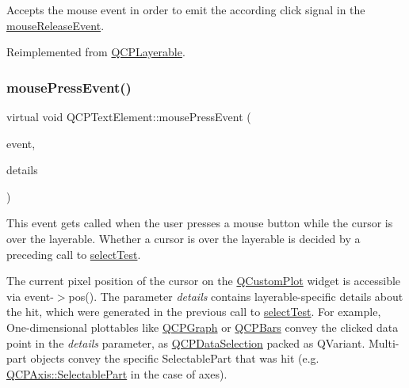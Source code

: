 Accepts the mouse event in order to emit the according click signal in the \hyperlink{class_q_c_p_text_element_acfcbaf9b1da18745e72726aafb39c855}{mouse\+Release\+Event}.

Reimplemented from \hyperlink{class_q_c_p_layerable_af6567604818db90f4fd52822f8bc8376}{Q\+C\+P\+Layerable}.

\mbox{\label{class_q_c_p_text_element_aa52d0292e7444526cccd453945238f4b}} 
\subsubsection{\texorpdfstring{mouse\+Press\+Event()}{mousePressEvent()}\hspace{0.1cm}{\footnotesize\ttfamily [2/2]}}
{\footnotesize\ttfamily virtual void Q\+C\+P\+Text\+Element\+::mouse\+Press\+Event (\begin{DoxyParamCaption}\item[{Q\+Mouse\+Event $\ast$}]{event,  }\item[{const Q\+Variant \&}]{details }\end{DoxyParamCaption})\hspace{0.3cm}{\ttfamily [virtual]}}

This event gets called when the user presses a mouse button while the cursor is over the layerable. Whether a cursor is over the layerable is decided by a preceding call to \hyperlink{class_q_c_p_text_element_a1e721bc2994a127ef5a8f0a514a5dbac}{select\+Test}.

The current pixel position of the cursor on the \hyperlink{class_q_custom_plot}{Q\+Custom\+Plot} widget is accessible via {\ttfamily event-\/$>$pos()}. The parameter {\itshape details} contains layerable-\/specific details about the hit, which were generated in the previous call to \hyperlink{class_q_c_p_text_element_a1e721bc2994a127ef5a8f0a514a5dbac}{select\+Test}. For example, One-\/dimensional plottables like \hyperlink{class_q_c_p_graph}{Q\+C\+P\+Graph} or \hyperlink{class_q_c_p_bars}{Q\+C\+P\+Bars} convey the clicked data point in the {\itshape details} parameter, as \hyperlink{class_q_c_p_data_selection}{Q\+C\+P\+Data\+Selection} packed as Q\+Variant. Multi-\/part objects convey the specific {\ttfamily Selectable\+Part} that was hit (e.\+g. \hyperlink{class_q_c_p_axis_abee4c7a54c468b1385dfce2c898b115f}{Q\+C\+P\+Axis\+::\+Selectable\+Part} in the case of axes).

